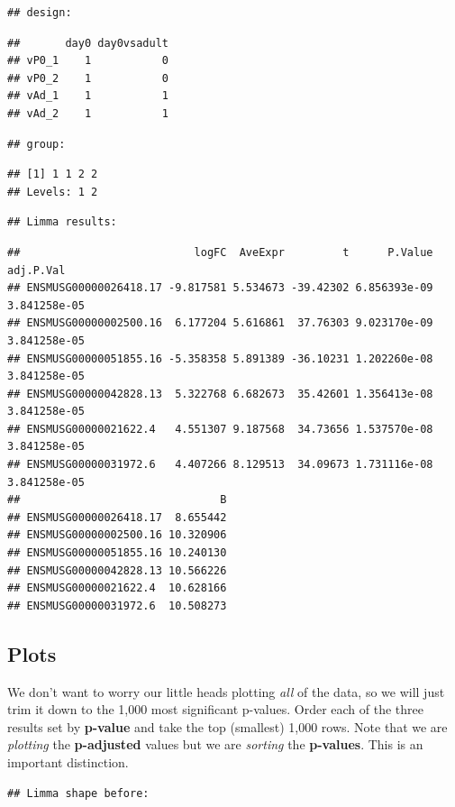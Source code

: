 \documentclass[
]{article}
\begin{document}
\begin{verbatim}
## design:
\end{verbatim}

\begin{verbatim}
##       day0 day0vsadult
## vP0_1    1           0
## vP0_2    1           0
## vAd_1    1           1
## vAd_2    1           1
\end{verbatim}

\begin{verbatim}
## group:
\end{verbatim}

\begin{verbatim}
## [1] 1 1 2 2
## Levels: 1 2
\end{verbatim}

\begin{verbatim}
## Limma results:
\end{verbatim}

\begin{verbatim}
##                           logFC  AveExpr         t      P.Value    adj.P.Val
## ENSMUSG00000026418.17 -9.817581 5.534673 -39.42302 6.856393e-09 3.841258e-05
## ENSMUSG00000002500.16  6.177204 5.616861  37.76303 9.023170e-09 3.841258e-05
## ENSMUSG00000051855.16 -5.358358 5.891389 -36.10231 1.202260e-08 3.841258e-05
## ENSMUSG00000042828.13  5.322768 6.682673  35.42601 1.356413e-08 3.841258e-05
## ENSMUSG00000021622.4   4.551307 9.187568  34.73656 1.537570e-08 3.841258e-05
## ENSMUSG00000031972.6   4.407266 8.129513  34.09673 1.731116e-08 3.841258e-05
##                               B
## ENSMUSG00000026418.17  8.655442
## ENSMUSG00000002500.16 10.320906
## ENSMUSG00000051855.16 10.240130
## ENSMUSG00000042828.13 10.566226
## ENSMUSG00000021622.4  10.628166
## ENSMUSG00000031972.6  10.508273
\end{verbatim}

\subsection{Plots}\label{plots}

We don't want to worry our little heads plotting \emph{all} of the data,
so we will just trim it down to the 1,000 most significant p-values.
Order each of the three results set by \textbf{p-value} and take the top
(smallest) 1,000 rows. Note that we are \emph{plotting} the
\textbf{p-adjusted} values but we are \emph{sorting} the
\textbf{p-values}. This is an important distinction.

\begin{verbatim}
## Limma shape before:
\end{verbatim}
\end{document}
